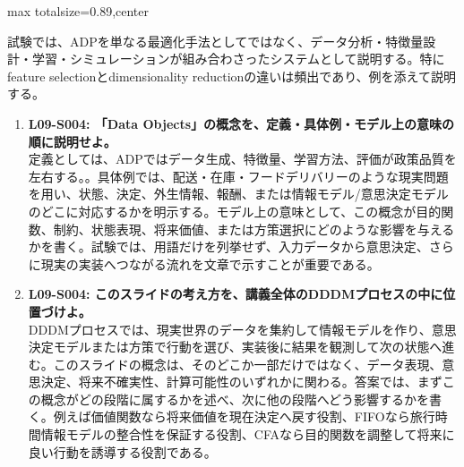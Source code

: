 \begin{minipage}[t]{0.58\textwidth}
\begin{adjustbox}{max totalsize={\textwidth}{0.89\textheight},center}
\begin{minipage}{\textwidth}
試験では、ADPを単なる最適化手法としてではなく、データ分析・特徴量設計・学習・シミュレーションが組み合わさったシステムとして説明する。特にfeature selectionとdimensionality reductionの違いは頻出であり、例を添えて説明する。\par{}\begin{enumerate}\item \textbf{L09-S004: 「Data Objects」の概念を、定義・具体例・モデル上の意味の順に説明せよ。}\\定義としては、ADPではデータ生成、特徴量、学習方法、評価が政策品質を左右する。。具体例では、配送・在庫・フードデリバリーのような現実問題を用い、状態、決定、外生情報、報酬、または情報モデル/意思決定モデルのどこに対応するかを明示する。モデル上の意味として、この概念が目的関数、制約、状態表現、将来価値、または方策選択にどのような影響を与えるかを書く。試験では、用語だけを列挙せず、入力データから意思決定、さらに現実の実装へつながる流れを文章で示すことが重要である。\item \textbf{L09-S004: このスライドの考え方を、講義全体のDDDMプロセスの中に位置づけよ。}\\DDDMプロセスでは、現実世界のデータを集約して情報モデルを作り、意思決定モデルまたは方策で行動を選び、実装後に結果を観測して次の状態へ進む。このスライドの概念は、そのどこか一部だけではなく、データ表現、意思決定、将来不確実性、計算可能性のいずれかに関わる。答案では、まずこの概念がどの段階に属するかを述べ、次に他の段階へどう影響するかを書く。例えば価値関数なら将来価値を現在決定へ戻す役割、FIFOなら旅行時間情報モデルの整合性を保証する役割、CFAなら目的関数を調整して将来に良い行動を誘導する役割である。\end{enumerate}
\end{minipage}
\end{adjustbox}
\end{minipage}


